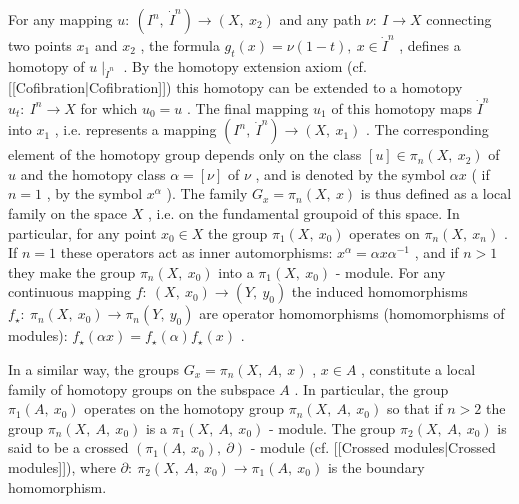 For any mapping $  u : \  ( I ^{n} ,\  \dot{I}  ^{n} ) \rightarrow ( X ,\  x _{2} ) $ 
and any path $  \nu : \  I \rightarrow X $ 
connecting two points $  x _{1} $ 
and $  x _{2} $ , 
the formula $  g _{t} (x) = \nu ( 1 - t ) ,\  x \in \dot{I}  ^{n} $ , 
defines a homotopy of $  u \mid _ {\dot{I}  ^{n}} $ . 
By the homotopy extension axiom (cf. [[Cofibration|Cofibration]]) this homotopy can be extended to a homotopy $  u _{t} : \  I ^{n} \rightarrow X $ 
for which $  u _{0} = u $ . 
The final mapping $  u _{1} $ 
of this homotopy maps $  \dot{I}  ^{n} $ 
into $  x _{1} $ , 
i.e. represents a mapping $  ( I ^{n} ,\  \dot{I}  ^{n} ) \rightarrow ( X ,\  x _{1} ) $ . 
The corresponding element of the homotopy group depends only on the class $  [ u ] \in \pi _{n} ( X ,\  x _{2} ) $ 
of $  u $ 
and the homotopy class $  \alpha = [ \nu ] $ 
of $  \nu $ , 
and is denoted by the symbol $  \alpha x $ (
if $  n = 1 $ , 
by the symbol $  x ^ \alpha  $ ). 
The family $  G _{x} = \pi _{n} ( X ,\  x ) $ 
is thus defined as a local family on the space $  X $ , 
i.e. on the fundamental groupoid of this space. In particular, for any point $  x _{0} \in X $ 
the group $  \pi _{1} ( X ,\  x _{0} ) $ 
operates on $  \pi _{n} ( X ,\  x _{n} ) $ . 
If $  n = 1 $ 
these operators act as inner automorphisms: $  x ^ \alpha  = \alpha x \alpha ^{-1} $ , 
and if $  n > 1 $ 
they make the group $  \pi _{n} ( X ,\  x _{0} ) $ 
into a $  \pi _{1} ( X ,\  x _{0} ) $ -
module. For any continuous mapping $  f : \  ( X ,\  x _{0} ) \rightarrow ( Y ,\  y _{0} ) $ 
the induced homomorphisms $  f _ \star  : \  \pi _{n} ( X ,\  x _{0} ) \rightarrow \pi _{n} ( Y ,\  y _{0} ) $ 
are operator homomorphisms (homomorphisms of modules): $  f _ \star  ( \alpha x ) = f _ \star  ( \alpha ) f _ \star  (x) $ .


In a similar way, the groups $  G _{x} = \pi _{n} ( X ,\  A ,\  x ) $ , 
$  x \in A $ , 
constitute a local family of homotopy groups on the subspace $  A $ . 
In particular, the group $  \pi _{1} ( A ,\  x _{0} ) $ 
operates on the homotopy group $  \pi _{n} ( X ,\  A ,\  x _{0} ) $ 
so that if $  n > 2 $ 
the group $  \pi _{n} ( X ,\  A ,\  x _{0} ) $ 
is a $  \pi _{1} ( X ,\  A ,\  x _{0} ) $ -
module. The group $  \pi _{2} ( X ,\  A ,\  x _{0} ) $ 
is said to be a crossed $  ( \pi _{1} ( A ,\  x _{0} ) ,\  \partial ) $ -
module (cf. [[Crossed modules|Crossed modules]]), where $  \partial : \  \pi _{2} ( X ,\  A ,\  x _{0} ) \rightarrow \pi _{1} ( A ,\  x _{0} ) $ 
is the boundary homomorphism.

